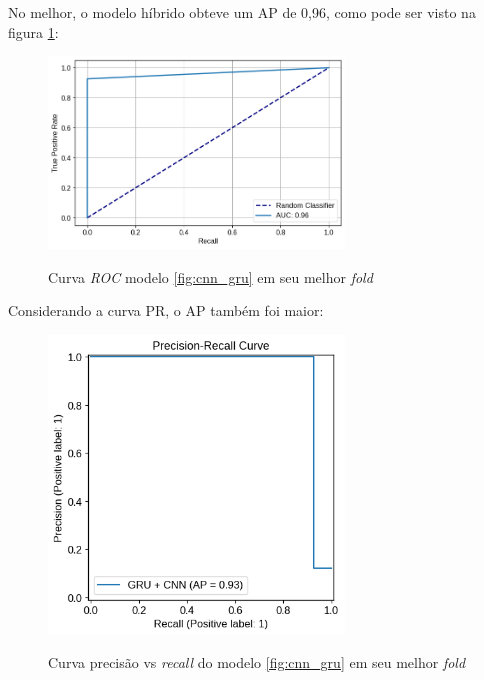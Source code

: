 No melhor, o modelo híbrido obteve um AP de 0,96, como pode ser visto na figura \ref{fig:roc_cnn_gru_melhor_fold}:


\begin{figure}[H]
  \centering
  \caption{Curva \textit{ROC} modelo \ref{fig:cnn_gru} em seu melhor \textit{fold}}
   \includegraphics[width=0.7\textwidth]{figuras/modelos_resultados/gru_cnn/roc_cnn_melhor_fold_1.png} 
  \label{fig:roc_cnn_gru_melhor_fold}
\end{figure}

Considerando a curva PR, o AP também foi maior:

\begin{figure}[H]
  \centering
  \caption{Curva precisão vs \textit{recall} do modelo \ref{fig:cnn_gru} em seu melhor \textit{fold}}
   \includegraphics[width=0.7\textwidth]{figuras/modelos_resultados/gru_cnn/ap_gru_cnn_melhor_fold_1.png} 
  \label{fig:ap_cnn_gru_melhor_fold}
\end{figure}

